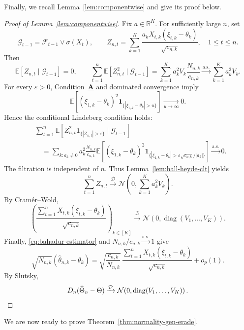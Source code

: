 {\color{revisiongreen}Finally, we recall Lemma~\ref{lem:componentwise} and give its proof below.

\begin{proof}[Proof of Lemma~\ref{lem:componentwise}]
Fix \(a\in\mathbb{R}^K\). For sufficiently large \(n\), set
\[
\mathcal{G}_{t-1}=\mathcal{F}_{t-1}\vee\sigma(X_t),\qquad
Z_{n,t}=\sum_{k=1}^K\frac{a_kX_{t,k}(\xi_{t,k}-\theta_k)}{\sqrt{c_{n,k}}},
\quad 1\leq t\leq n.
\]
Then
\[
\mathbb{E}[Z_{n,t}\mid\mathcal{G}_{t-1}]=0,\qquad
\sum_{t=1}^n\mathbb{E}[Z_{n,t}^2\mid\mathcal{G}_{t-1}]
=\sum_{k=1}^K a_k^2V_k\frac{N_{n,k}}{c_{n,k}}
\xrightarrow{\mathrm{a.s.}}\sum_{k=1}^K a_k^2V_k.
\]
For every \(\varepsilon>0\), Condition~\hyperlink{CA}{\textbf{A}} and
dominated convergence imply
\[
\mathbb{E}\!\left[(\xi_{1,k}-\theta_k)^2
\mathbf{1}_{\{|\xi_{1,k}-\theta_k|>u\}}\right]
\xrightarrow[u\to\infty]{}0.
\]
Hence the conditional Lindeberg condition holds:
\begin{align*}
&\sum_{t=1}^n\mathbb{E}\!\left[
Z_{n,t}^2\mathbf{1}_{\{|Z_{n,t}|>\varepsilon\}}
\mid\mathcal{G}_{t-1}\right]\\
&\quad=\sum_{k:a_k\neq0}a_k^2\frac{N_{n,k}}{c_{n,k}}
\mathbb{E}\!\left[(\xi_{1,k}-\theta_k)^2
\mathbf{1}_{\{|\xi_{1,k}-\theta_k|>
\varepsilon\sqrt{c_{n,k}}/|a_k|\}}\right]
\xrightarrow{\mathrm{a.s.}}0.
\end{align*}
The filtration is independent of \(n\). Thus
Lemma~\ref{lem:hall-heyde-clt} yields
\[
\sum_{t=1}^n Z_{n,t}
\xrightarrow{\mathcal D}
\mathcal N\!\left(0,\sum_{k=1}^K a_k^2V_k\right).
\]
By Cram\'er--Wold,
\[
\left(\frac{\sum_{t=1}^n X_{t,k}(\xi_{t,k}-\theta_k)}
{\sqrt{c_{n,k}}}\right)_{k\in[K]}
\xrightarrow{\mathcal D}
\mathcal N\!\left(0,\operatorname{diag}(V_1,\ldots,V_K)\right).
\]
Finally, \eqref{eq:bahadur-estimator} and
\(N_{n,k}/c_{n,k}\xrightarrow{\mathrm{a.s.}}1\) give
\[
\sqrt{N_{n,k}}(\hat\theta_{n,k}-\theta_k)
=\sqrt{\frac{c_{n,k}}{N_{n,k}}}\,
\frac{\sum_{t=1}^n X_{t,k}(\xi_{t,k}-\theta_k)}{\sqrt{c_{n,k}}}
+o_p(1).
\]
By Slutsky,
\[
D_n(\widehat\Theta_n-\Theta)
\xrightarrow{\mathcal D}
\mathcal N\!\left(0,\operatorname{diag}(V_1,\ldots,V_K)\right).
\qedhere
\]
\end{proof}
}


We are now ready to prove Theorem~\ref{thm:normality-gen-erade}.

